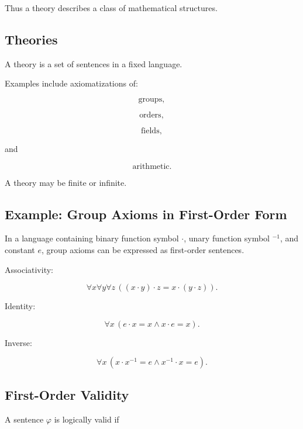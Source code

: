 Thus a theory describes a class of mathematical structures.

\subsection{Theories}
\label{subsec:formal-theories}

A theory is a set of sentences in a fixed language.

Examples include axiomatizations of:

\[
\boxed{
\text{groups},
}
\]

\[
\boxed{
\text{orders},
}
\]

\[
\boxed{
\text{fields},
}
\]

and

\[
\boxed{
\text{arithmetic}.
}
\]

A theory may be finite or infinite.

\subsection{Example: Group Axioms in First-Order Form}
\label{subsec:first-order-group-axioms}

In a language containing binary function symbol \(\cdot\), unary function
symbol \(^{-1}\), and constant \(e\), group axioms can be expressed as
first-order sentences.

Associativity:

\[
\boxed{
\forall x\forall y\forall z
\,
((x\cdot y)\cdot z
=
x\cdot(y\cdot z)).
}
\]

Identity:

\[
\boxed{
\forall x
\,
(e\cdot x=x
\land
x\cdot e=x).
}
\]

Inverse:

\[
\boxed{
\forall x
\,
(x\cdot x^{-1}=e
\land
x^{-1}\cdot x=e).
}
\]

\subsection{First-Order Validity}
\label{subsec:first-order-validity}

A sentence \(\varphi\) is logically valid if

